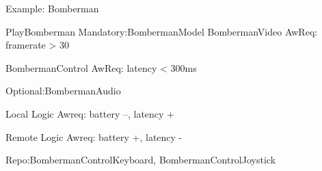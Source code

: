 Example:
Bomberman

PlayBomberman
Mandatory:BombermanModel
BombermanVideo
  AwReq: framerate > 30

BombermanControl
  AwReq: latency < 300ms

Optional:BombermanAudio

Local Logic
  Awreq: battery --, latency +

Remote Logic
  Awreq: battery +, latency -



Repo:BombermanControlKeyboard, BombermanControlJoystick
